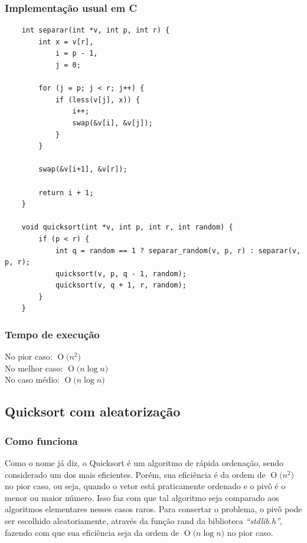 \documentclass[12pt,a4paper]{article}
\newcommand{\BigO}[1]{\ensuremath{\operatorname{O}\bigl(#1\bigr)}}
\begin{document}
	\subsubsection{Implementação usual em C}
	\begin{minipage}{\linewidth}
	\begin{lstlisting}
	int separar(int *v, int p, int r) {
		int x = v[r], 
			i = p - 1, 
			j = 0;

		for (j = p; j < r; j++) {
			if (less(v[j], x)) {
				i++;
				swap(&v[i], &v[j]);
			}
		}

		swap(&v[i+1], &v[r]);

		return i + 1;
	}

	void quicksort(int *v, int p, int r, int random) {
		if (p < r) {
			int q = random == 1 ? separar_random(v, p, r) : separar(v, p, r);
			quicksort(v, p, q - 1, random);
			quicksort(v, q + 1, r, random);
		}
	}
	\end{lstlisting}
	\end{minipage}

	\subsubsection{Tempo de execução}
	\indent No pior caso: \BigO{n^2}\\
	\indent No melhor caso: \BigO{n\log{}n}\\
	\indent No caso médio: \BigO{n\log{}n}


	\subsection{Quicksort com aleatorização}

	\subsubsection{Como funciona}
	\indent Como o nome já diz, o Quicksort é um algoritmo de rápida ordenação, sendo considerado um dos mais eficientes. Porém, sua eficiência é da ordem de \BigO{n^2} no pior caso, ou seja, quando o vetor está praticamente ordenado e o pivô é o menor ou maior número. Isso faz com que tal algoritmo seja comparado aos algoritmos elementares nesses casos raros. Para consertar o problema, o pivô pode ser escolhido aleatoriamente, através da função rand da biblioteca \textit{“stdlib.h”}, fazendo com que sua eficiência seja da ordem de \BigO{n\log{}n} no pior caso.
\end{document}
